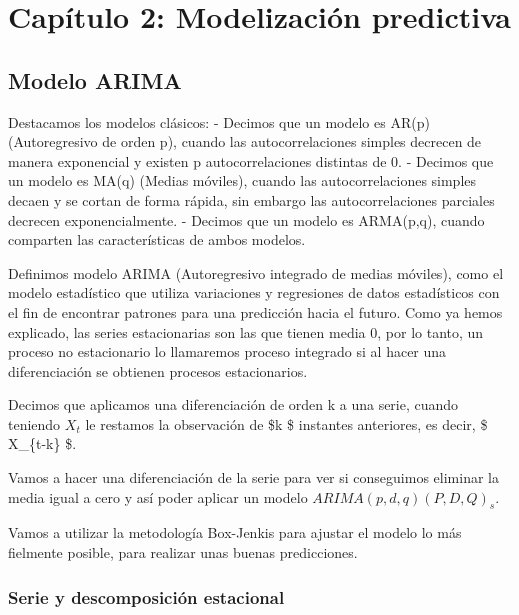 \documentclass[11pt]{article}
\begin{document}
    \hypertarget{capuxedtulo-2-modelizaciuxf3n-predictiva}{%
\section{Capítulo 2: Modelización
predictiva}\label{capuxedtulo-2-modelizaciuxf3n-predictiva}}

    \hypertarget{modelo-arima}{%
\subsection{Modelo ARIMA}\label{modelo-arima}}

    Destacamos los modelos clásicos: - Decimos que un modelo es AR(p)
(Autoregresivo de orden p), cuando las autocorrelaciones simples
decrecen de manera exponencial y existen p autocorrelaciones distintas
de \(0\). - Decimos que un modelo es MA(q) (Medias móviles), cuando las
autocorrelaciones simples decaen y se cortan de forma rápida, sin
embargo las autocorrelaciones parciales decrecen exponencialmente. -
Decimos que un modelo es ARMA(p,q), cuando comparten las características
de ambos modelos.

Definimos modelo ARIMA (Autoregresivo integrado de medias móviles), como
el modelo estadístico que utiliza variaciones y regresiones de datos
estadísticos con el fin de encontrar patrones para una predicción hacia
el futuro. Como ya hemos explicado, las series estacionarias son las que
tienen media \(0\), por lo tanto, un proceso no estacionario lo
llamaremos proceso integrado si al hacer una diferenciación se obtienen
procesos estacionarios.

Decimos que aplicamos una diferenciación de orden k a una serie, cuando
teniendo \(X_t\) le restamos la observación de \$k \$ instantes
anteriores, es decir, \$ X\_\{t-k\} \$.

Vamos a hacer una diferenciación de la serie para ver si conseguimos
eliminar la media igual a cero y así poder aplicar un modelo
\(ARIMA(p,d,q)(P,D,Q)_s\).

Vamos a utilizar la metodología Box-Jenkis para ajustar el modelo lo más
fielmente posible, para realizar unas buenas predicciones.

    \hypertarget{serie-y-descomposiciuxf3n-estacional}{%
\subsubsection{Serie y descomposición
estacional}\label{serie-y-descomposiciuxf3n-estacional}}
\end{document}

